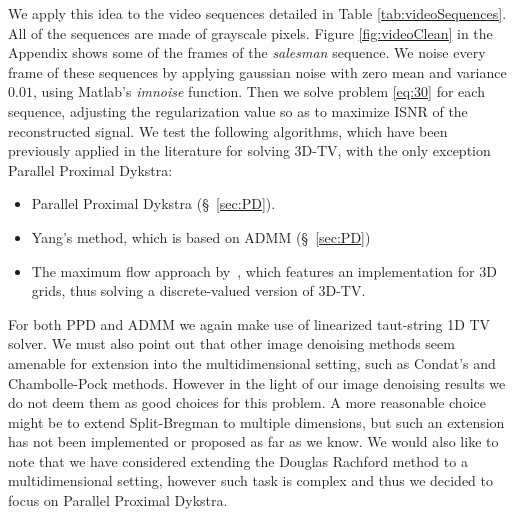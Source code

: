 \documentclass[twoside,11pt]{article}
\numberwithin{equation}{section}
\numberwithin{theorem}{section}
\begin{document}
We apply this idea to the video sequences detailed in Table \ref{tab:videoSequences}. All of the sequences are made of grayscale pixels. Figure \ref{fig:videoClean} in the Appendix shows some of the  frames of the {\it salesman} sequence. We noise every frame of these sequences by applying gaussian noise with zero mean and variance $0.01$, using Matlab's {\it imnoise} function. Then we solve problem \ref{eq:30} for each sequence, adjusting the regularization value so as to maximize ISNR of the reconstructed signal. We test the following algorithms, which have been previously applied in the literature for solving 3D-TV, with the only exception Parallel Proximal Dykstra:
\begin{itemize}
  \setlength{\itemsep}{0pt}
 \item Parallel Proximal Dykstra (§~\ref{sec:PD}).
 \item Yang's method, which is based on ADMM (§~\ref{sec:PD})
 \item The maximum flow approach by~\citet{goldfarb2009parametric}, which features an implementation for 3D grids, thus solving a discrete-valued version of 3D-TV.
\end{itemize}
For both PPD and ADMM we again make use of linearized taut-string 1D TV solver. We must also point out that other image denoising methods seem amenable for extension into the multidimensional setting, such as Condat's and Chambolle-Pock methods. However in the light of our image denoising results we do not deem them as good choices for this problem. A more reasonable choice might be to extend Split-Bregman to multiple dimensions, but such an extension has not been implemented or proposed as far as we know. We would also like to note that we have considered extending the Douglas Rachford method to a multidimensional setting, however such task is complex and thus we decided to focus on Parallel Proximal Dykstra.
\end{document}
